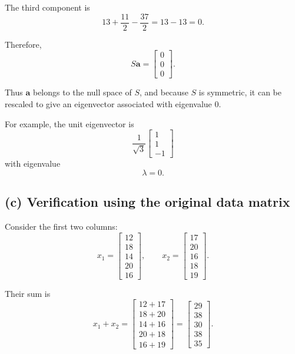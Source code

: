 \documentclass[12pt,a4paper]{article}
\begin{document}
The third component is
\[
13+\frac{11}{2}-\frac{37}{2}
=
13-\!13
=
0.
\]

Therefore,
\[
\boxed{
S\mathbf{a}
=
\begin{bmatrix}
0\\0\\0
\end{bmatrix}}.
\]

Thus \(\mathbf{a}\) belongs to the null space of \(S\), and because \(S\) is symmetric, it can be rescaled to give an eigenvector associated with eigenvalue \(0\).

For example, the unit eigenvector is
\[
\boxed{
\frac{1}{\sqrt3}
\begin{bmatrix}
1\\1\\-1
\end{bmatrix}}
\]
with eigenvalue
\[
\boxed{\lambda=0}.
\]

\subsection*{(c) Verification using the original data matrix}

Consider the first two columns:
\[
x_1=
\begin{bmatrix}
12\\18\\14\\20\\16
\end{bmatrix},
\qquad
x_2=
\begin{bmatrix}
17\\20\\16\\18\\19
\end{bmatrix}.
\]

Their sum is
\[
x_1+x_2
=
\begin{bmatrix}
12+17\\
18+20\\
14+16\\
20+18\\
16+19
\end{bmatrix}
=
\begin{bmatrix}
29\\38\\30\\38\\35
\end{bmatrix}.
\]
\end{document}
